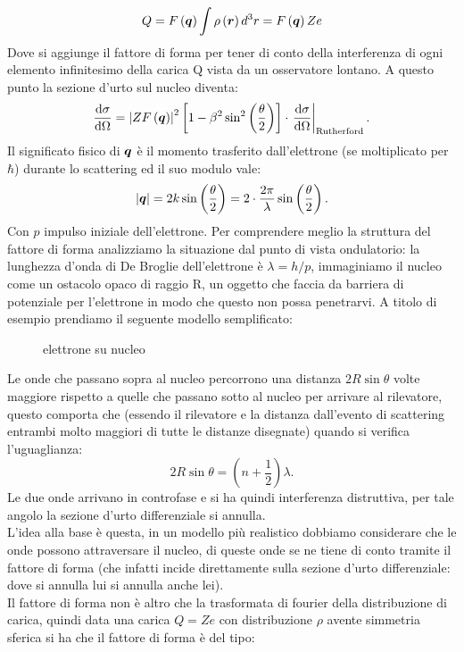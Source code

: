 \[
	Q = F\left(\boldsymbol{q}\right)\int\rho\left(\boldsymbol{r}\right)d^3r = F\left(\boldsymbol{q}\right) Ze 
\]
Dove si aggiunge il fattore di forma per tener di conto della interferenza di ogni elemento infinitesimo della carica Q vista da un osservatore lontano. A questo punto la sezione d'urto sul nucleo diventa:
\[
	\frac{\mbox{d} \sigma}{\mbox{d} \Omega} =
		\left|Z F\left( \boldsymbol{q} \right)  \right|^2\left[ 1- \beta^2\sin^2\left( \frac{\theta}{2} \right)  \right]
		\cdot \left.\frac{\mbox{d} \sigma}{\mbox{d} \Omega} \right|_{\text{Rutherford}}
.\] 
Il significato fisico di $\boldsymbol{q}$ è il momento trasferito dall'elettrone (se moltiplicato per $\hbar$) durante lo scattering ed il suo modulo vale:
\[
	\left|\boldsymbol{q}\right|= 2k\sin\left(\frac{\theta}{2}\right)= 2\cdot \frac{2\pi}{\lambda}\sin\left( \frac{\theta}{2} \right) 
.\] 
Con $p$ impulso iniziale dell'elettrone. Per comprendere meglio la struttura del fattore di forma analizziamo la situazione dal punto di vista ondulatorio: la lunghezza d'onda di De Broglie dell'elettrone è $\lambda = h /p$, immaginiamo il nucleo come un ostacolo opaco di raggio R, un oggetto che faccia da barriera di potenziale per l'elettrone in modo che questo non possa penetrarvi. A titolo di esempio prendiamo il seguente modello semplificato:
\begin{figure}[H]
    \centering
    \caption{elettrone su nucleo}
    \label{fig:elettrone-su-nucleo-fattore-forma}
\end{figure}
Le onde che passano sopra al nucleo percorrono una distanza $2R\sin\theta$ volte maggiore rispetto a quelle che passano sotto al nucleo per arrivare al rilevatore, questo comporta che (essendo il rilevatore e la distanza dall'evento di scattering entrambi molto maggiori di tutte le distanze disegnate) quando si verifica l'uguaglianza:
\[
	2R\sin\theta = \left( n + \frac{1}{2} \right)\lambda 
.\] 
Le due onde arrivano in controfase e si ha quindi interferenza distruttiva, per tale angolo la sezione d'urto differenziale si annulla.\\
L'idea alla base è questa, in un modello più realistico dobbiamo considerare che le onde possono attraversare il nucleo, di queste onde se ne tiene di conto tramite il fattore di forma (che infatti incide direttamente sulla sezione d'urto differenziale: dove si annulla lui si annulla anche lei).\\
Il fattore di forma non è altro che la trasformata di fourier della distribuzione di carica, quindi data una carica $Q = Ze$ con distribuzione $\rho$ avente simmetria sferica si ha che il fattore di forma è del tipo: 
